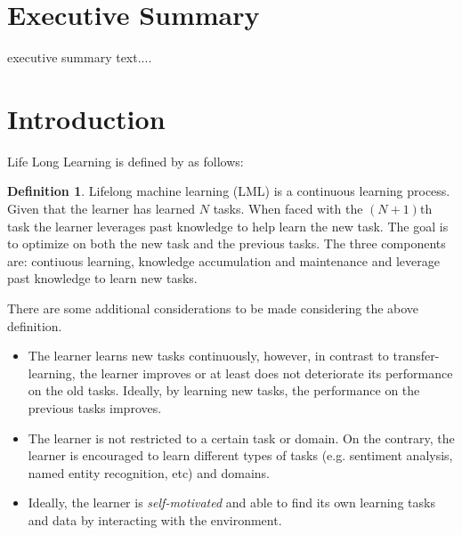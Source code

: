 \documentclass{lihlith}
\theoremstyle{definition}
\newtheorem{definition}{Definition}[section]
\theoremstyle{remark}
\begin{document}


\cleardoublepage
\begin{nwrrevisions}

\end{nwrrevisions}

\cleardoublepage
\section*{Executive Summary}

executive summary text....


\cleardoublepage
\tableofcontents
\cleardoublepage



\section{Introduction}
\label{sec:introduction}

Life Long Learning is defined by \cite{chen2016lifelong} as follows: 

\theoremstyle{definition}
\begin{definition}{Lifelong machine learning (LML)} is a continuous learning process. Given that the learner has learned $N$ tasks. When faced with the $(N+1)$th task the learner leverages past knowledge to help learn the new task. The goal is to optimize on both the new task and the previous tasks. The three components are: contiuous learning, knowledge accumulation and maintenance and leverage past knowledge to learn new tasks. 
\end{definition}
There are some additional considerations to be made considering the above definition. 
\begin{itemize}
\item The learner learns new tasks continuously, however, in contrast to transfer-learning, the learner improves or at least does not deteriorate its performance on the old tasks. Ideally, by learning new tasks, the performance on the previous tasks improves. 
\item The learner is not restricted to a certain task or domain. On the contrary, the learner is encouraged to learn different types of tasks (e.g. sentiment analysis, named entity recognition, etc) and domains. 
\item Ideally, the learner is \emph{self-motivated} and able to find its own learning tasks and data by interacting with the environment. 
\end{itemize}
\end{document}
